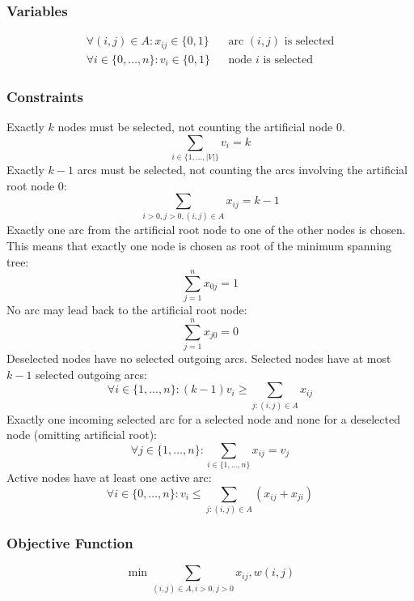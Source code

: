 \documentclass{article}
\begin{document}
\subsubsection{Variables}
\begin{eqnarray}
\forall(i,j)\in A: x_{ij} \in \{0,1\}  && \text{arc $(i,j)$ is selected} \\
\forall i \in \{0,\ldots,n\}: v_i \in \{0, 1\} && \text{node $i$ is selected} 
\end{eqnarray}
\subsubsection{Constraints}
Exactly $k$ nodes must be selected, not counting the artificial node $0$.
\begin{equation}
\sum_{i\in\{1,\ldots,|V|\}} v_i = k
\end{equation}
Exactly $k-1$ arcs must be selected, not counting the arcs involving the artificial root node $0$:
\begin{equation}
\sum_{i>0, j>0, (i,j)\in A} x_{ij} = k - 1 
\end{equation}
Exactly one arc from the artificial root node to one of the other nodes is chosen. This means that exactly one node is chosen as root of the minimum spanning tree:
\begin{equation}
\sum_{j=1}^{n} x_{0j} = 1
\end{equation}
No arc may lead back to the artificial root node:
\begin{equation}
\sum_{j=1}^{n} x_{j0} = 0
\end{equation}
Deselected nodes have no selected outgoing arcs. Selected nodes have at most $k - 1$ selected outgoing arcs:
\begin{equation}
\forall i \in \{1,\ldots,n\}: (k-1)v_i \geq \sum_{j:(i,j)\in A} x_{ij}
\end{equation}
Exactly one incoming selected arc for a selected node and none for a deselected node (omitting artificial root):
\begin{equation}
\forall j\in\{1,\ldots,n\}: \sum_{i\in\{1,\ldots,n\}} x_{ij} = v_j
\end{equation}
Active nodes have at least one active arc:
\begin{equation}
\forall i\in\{0,\ldots,n\}:  v_i \leq \sum_{j:(i,j)\in A} (x_{ij} + x_{ji})
\end{equation}

\subsubsection{Objective Function}
\begin{equation}
\min \sum_{(i, j) \in A, i>0, j>0} x_{ij},w(i,j) 
\end{equation}
\end{document}
